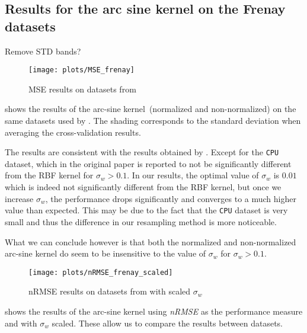 \subsection{Results for the arc sine kernel on the Frenay datasets}

\begin{important}
    Remove STD bands?
\end{important}
\begin{figure}[H]
    \texttt{[image: plots/MSE\_frenay]}
    \caption{MSE results on datasets from \cite{frenayParameterinsensitiveKernelExtreme2011}}
    \label{fig:mse-frenay}
\end{figure}

 shows the results of the arc-sine
kernel~(normalized and non-normalized) on the same datasets used by \textcite{frenayParameterinsensitiveKernelExtreme2011}. The shading corresponds to the standard deviation when averaging the
cross-validation results.

The results are consistent with the results obtained by \citeauthor{frenayParameterinsensitiveKernelExtreme2011}.
Except for the \texttt{CPU} dataset, which in the original paper is reported to
not be significantly different from the RBF kernel for $\sigma_w > 0.1$. In
our results, the optimal value of $\sigma_w$ is $0.01$ which is indeed not
significantly different from the RBF kernel, but once we increase $\sigma_w$,
the performance drops significantly and converges to a much higher value than
expected. This may be due to the fact that the \texttt{CPU} dataset is very
small and thus the difference in our resampling method is more noticeable.

What we can conclude however is that both the normalized and non-normalized
arc-sine kernel do seem to be insensitive to the value of $\sigma_w$ for
$\sigma_w > 0.1$.

\begin{figure}[H]
    \texttt{[image: plots/nRMSE\_frenay\_scaled]}
    \caption{nRMSE results on datasets from \cite{frenayParameterinsensitiveKernelExtreme2011} with
        scaled $\sigma_w$}%
    \label{fig:nrmse-frenay-scaled}
\end{figure}

 shows the results of the arc-sine kernel using
\emph{nRMSE} as the performance measure and with $\sigma_w$ scaled. These allow
us to compare the results between datasets.

